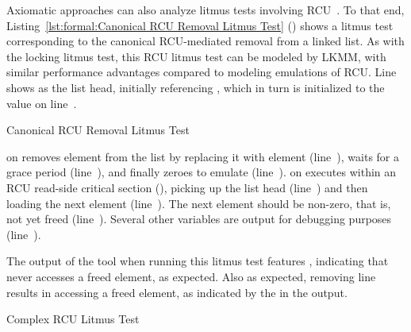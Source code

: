 \begin{fcvref}
Axiomatic approaches can also analyze litmus tests involving
RCU~\cite{Alglave:2018:FSC:3173162.3177156}.
To that end,
Listing~\ref{lst:formal:Canonical RCU Removal Litmus Test}
()
shows a litmus test corresponding to the canonical RCU-mediated
removal from a linked list.
As with the locking litmus test, this RCU litmus test can be
modeled by LKMM, with similar performance advantages compared
to modeling emulations of RCU\@.
Line~ shows  as the list head, initially
referencing , which in turn is initialized to the value
 on line~.

\begin{listing}[tb]

\caption{Canonical RCU Removal Litmus Test}
\label{lst:formal:Canonical RCU Removal Litmus Test}
\end{listing}

 on 
removes element  from the list by replacing it with element 
(line~),
waits for a grace period (line~),
and finally zeroes  to emulate  (line~).
 on 
executes within an RCU read-side critical section
(),
picking up the list head (line~) and then
loading the next element (line~).
The next element should be non-zero, that is, not yet freed
(line~).
Several other variables are output for debugging purposes
(line~).

The output of the  tool when running this litmus test features
, indicating that  never accesses a freed element,
as expected.
Also as expected, removing line~ results in 
accessing a freed element, as indicated by the  in
the  output.
\end{fcvref}

\begin{listing}[tb]

\caption{Complex RCU Litmus Test}
\label{lst:formal:Complex RCU Litmus Test}
\end{listing}

